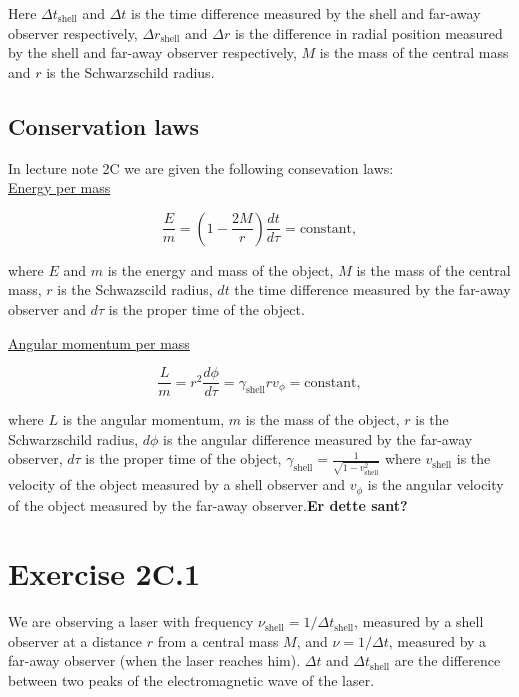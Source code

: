 \documentclass[a4paper,10pt,english]{article}
\begin{document}
Here $\Delta t_{\text{shell}}$ and $\Delta t$ is the time difference measured by the shell and far-away observer respectively, $\Delta r_{\text{shell}}$ and $\Delta r$ is the difference in radial position measured by the shell and far-away observer respectively, $M$ is the mass of the central mass and $r$ is the Schwarzschild radius.

\subsection*{Conservation laws}
In lecture note 2C we are given the following consevation laws:
\\
\underline{Energy per mass}

\begin{equation}\label{eq:E/m}
\frac{E}{m}=\left(1-\frac{2M}{r}\right)\frac{dt}{d\tau}=\text{constant},
\end{equation}

where $E$ and $m$ is the energy and mass of the object, $M$ is the mass of the central mass, $r$ is the Schwazscild radius, $dt$ the time difference measured by the far-away observer and $d\tau$ is the proper time of the object.

\underline{Angular momentum per mass}

\begin{equation}\label{eq:L/m}
\frac{L}{m}=r^{2}\frac{d\phi}{d\tau}=\gamma_{\text{shell}}rv_{\phi}=\text{constant},
\end{equation}

where $L$ is the angular momentum, $m$ is the mass of the object, $r$ is the Schwarzschild radius, $d\phi$ is the angular difference measured by the far-away observer, $d\tau$ is the proper time of the object, $\gamma_{\text{shell}}=\frac{1}{\sqrt{1-v_{\text{shell}}^{2}}}$ where $v_{\text{shell}}$ is the velocity of the object measured by a shell observer and $v_{\phi}$ is the angular velocity of the object measured by the far-away observer.\textbf{Er dette sant?}

\newpage








\section*{Exercise 2C.1}


We are observing a laser with frequency $\nu_{\text{shell}}=1/\Delta t_\text{shell}$, measured by a shell observer at a distance $r$ from a central mass $M$, and $\nu=1/\Delta t$, measured by a far-away observer (when the laser reaches him). $\Delta t$ and $\Delta t_\text{shell}$ are the difference between two peaks of the electromagnetic wave of the laser.
\end{document}
